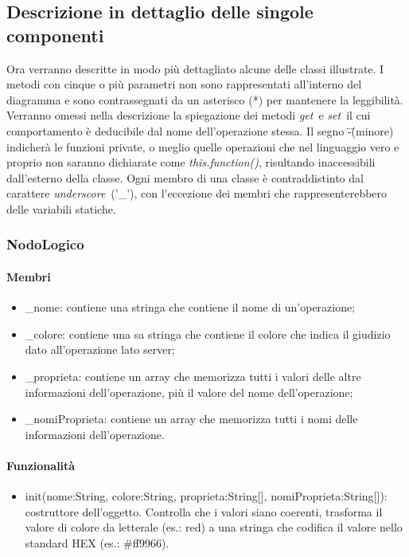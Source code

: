 \subsection{Descrizione in dettaglio delle singole componenti}
Ora verranno descritte in modo più dettagliato alcune delle classi illustrate. I metodi con cinque o più parametri non sono rappresentati  all'interno del diagramma e sono contrassegnati da un asterisco (*) per mantenere la leggibilità. Verranno omessi nella descrizione la spiegazione dei metodi \textit{get}\ e \textit{set}\ il cui comportamento è deducibile dal nome dell'operazione stessa. Il segno \"-\" (minore) indicherà le funzioni private, o meglio quelle operazioni che nel linguaggio vero e proprio non saranno dichiarate come \textit{this.function()}, risultando inaccessibili dall'esterno della classe. Ogni membro di una classe è contraddistinto dal carattere \textit{underscore}\ ('\_'), con l'eccezione dei membri che rappresenterebbero delle variabili statiche.
\subsubsection{NodoLogico}
\paragraph{Membri}
\begin{itemize}
\item \_nome: contiene una stringa che contiene il nome di un'operazione;
\item \_colore: contiene una sa stringa che contiene il colore che indica il giudizio dato all'operazione lato server;
\item \_proprieta: contiene un array che memorizza tutti i valori delle altre informazioni dell'operazione, più il valore del nome dell'operazione;
\item \_nomiProprieta: contiene un array che memorizza tutti i nomi delle informazioni dell'operazione.
\end{itemize}
\paragraph{Funzionalità}
\begin{itemize}
\item init(nome:String, colore:String, proprieta:String[], nomiProprieta:String[]): costruttore dell'oggetto. Controlla che i valori siano coerenti, trasforma il valore di colore da letterale (es.: red) a una stringa che codifica il valore nello standard HEX (es.: \#ff9966).
\end{itemize}
